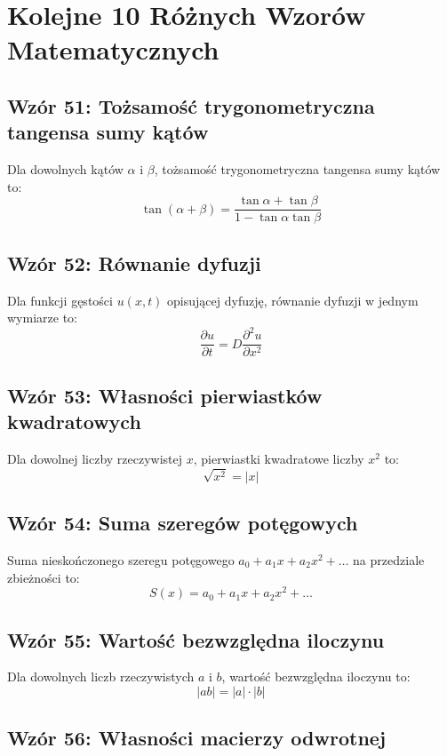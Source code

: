 \documentclass{article}
\begin{document}
\section*{Kolejne 10 Różnych Wzorów Matematycznych}

\subsection*{Wzór 51: Tożsamość trygonometryczna tangensa sumy kątów}

Dla dowolnych kątów \(\alpha\) i \(\beta\), tożsamość trygonometryczna tangensa sumy kątów to:
\[ \tan(\alpha + \beta) = \frac{\tan\alpha + \tan\beta}{1 - \tan\alpha \tan\beta} \]

\subsection*{Wzór 52: Równanie dyfuzji}

Dla funkcji gęstości \(u(x, t)\) opisującej dyfuzję, równanie dyfuzji w jednym wymiarze to:
\[ \frac{\partial u}{\partial t} = D \frac{\partial^2 u}{\partial x^2} \]

\subsection*{Wzór 53: Własności pierwiastków kwadratowych}

Dla dowolnej liczby rzeczywistej \(x\), pierwiastki kwadratowe liczby \(x^2\) to:
\[ \sqrt{x^2} = |x| \]

\subsection*{Wzór 54: Suma szeregów potęgowych}

Suma nieskończonego szeregu potęgowego \(a_0 + a_1x + a_2x^2 + \ldots\) na przedziale zbieżności to:
\[ S(x) = a_0 + a_1x + a_2x^2 + \ldots \]

\subsection*{Wzór 55: Wartość bezwzględna iloczynu}

Dla dowolnych liczb rzeczywistych \(a\) i \(b\), wartość bezwzględna iloczynu to:
\[ |ab| = |a| \cdot |b| \]

\subsection*{Wzór 56: Własności macierzy odwrotnej}
\end{document}
